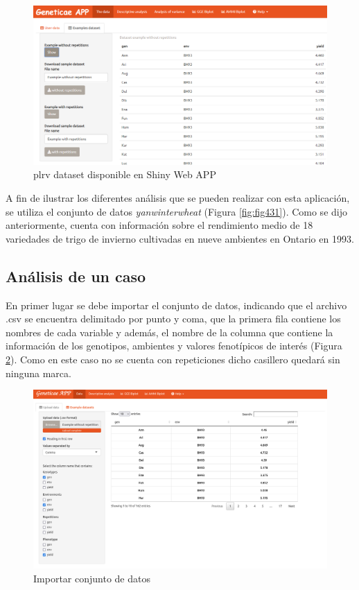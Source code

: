 \begin{figure}[H]
	\begin{center}
		\includegraphics[width=16cm]{./Graficos/Exampledatasets_withrep.png}
	\end{center}
	\caption{plrv dataset disponible en Shiny Web APP}
	\label{fig:fig432}
\end{figure}


A fin de ilustrar los diferentes análisis que se pueden realizar con esta aplicación, se utiliza el conjunto de datos \emph{yanwinterwheat} (Figura \ref{fig:fig431}). Como se dijo anteriormente, cuenta con información sobre el rendimiento medio de 18 variedades de trigo de invierno cultivadas en nueve ambientes en Ontario en 1993.


\subsection{Análisis de un caso}
En primer lugar se debe importar el conjunto de datos, indicando que el archivo .csv se encuentra delimitado por punto y coma, que la primera fila contiene los nombres de cada variable y además, el nombre de la columna que contiene la información de los genotipos, ambientes y valores fenotípicos de interés (Figura \ref{fig:fig433}). Como en este caso no se cuenta con repeticiones dicho casillero quedará sin ninguna marca. 

\begin{figure}[h]
	\begin{center}
		\includegraphics[width=16cm]{./Graficos/data.png}
	\end{center}
	\caption{Importar conjunto de datos}
	\label{fig:fig433}
\end{figure}


